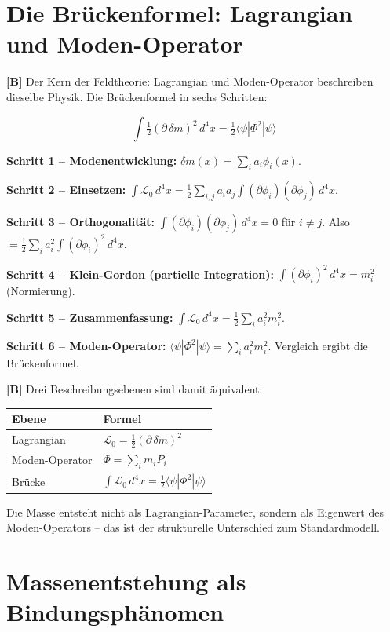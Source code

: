 \section{Die Brückenformel: Lagrangian und Moden-Operator}

\textbf{[B]} Der Kern der Feldtheorie: Lagrangian und Moden-Operator beschreiben
dieselbe Physik. Die Brückenformel in sechs Schritten:

\[
  \boxed{\;
    \int\tfrac12(\partial\,\delta m)^2\,d^4x
    = \tfrac12\langle\psi|\Phi^2|\psi\rangle
  \;}
\]

\textbf{Schritt 1 -- Modenentwicklung:}
$\delta m(x) = \sum_i a_i\phi_i(x)$.

\textbf{Schritt 2 -- Einsetzen:}
$\int\mathcal L_0\,d^4x
= \tfrac12\sum_{i,j}a_ia_j\int(\partial\phi_i)(\partial\phi_j)\,d^4x$.

\textbf{Schritt 3 -- Orthogonalität:}
$\int(\partial\phi_i)(\partial\phi_j)\,d^4x=0$ für $i\neq j$.
Also $= \tfrac12\sum_ia_i^2\int(\partial\phi_i)^2\,d^4x$.

\textbf{Schritt 4 -- Klein-Gordon (partielle Integration):}
$\int(\partial\phi_i)^2\,d^4x = m_i^2$ (Normierung).

\textbf{Schritt 5 -- Zusammenfassung:}
$\int\mathcal L_0\,d^4x = \tfrac12\sum_ia_i^2 m_i^2$.

\textbf{Schritt 6 -- Moden-Operator:}
$\langle\psi|\Phi^2|\psi\rangle = \sum_ia_i^2 m_i^2$.
Vergleich ergibt die Brückenformel.

\textbf{[B]} Drei Beschreibungsebenen sind damit äquivalent:

\begin{center}
\renewcommand{\arraystretch}{1.3}
{\small
\begin{tabular}{ll}
\toprule
Ebene & Formel \\
\midrule
Lagrangian     & $\mathcal L_0 = \tfrac12(\partial\,\delta m)^2$ \\
Moden-Operator & $\Phi = \sum_i m_i P_i$ \\
Brücke         & $\int\mathcal L_0\,d^4x = \tfrac12\langle\psi|\Phi^2|\psi\rangle$ \\
\bottomrule
\end{tabular}
}
\renewcommand{\arraystretch}{1.0}
\end{center}

Die Masse entsteht nicht als Lagrangian-Parameter, sondern als Eigenwert des
Moden-Operators -- das ist der strukturelle Unterschied zum Standardmodell.

\section{Massenentstehung als Bindungsphänomen}

